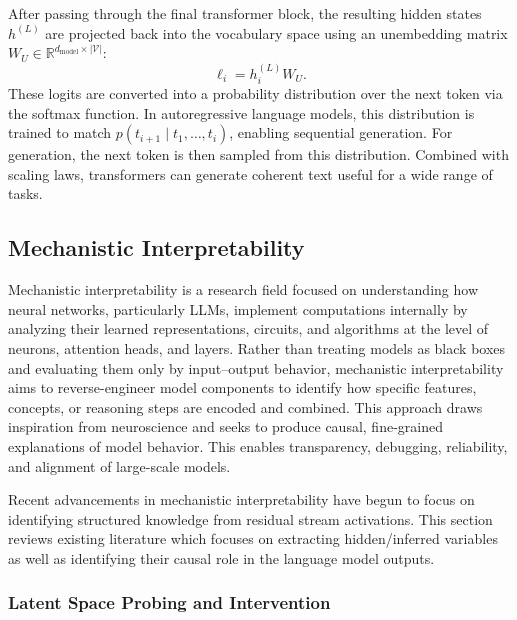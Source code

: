 \documentclass[11pt]{article}
\begin{document}
After passing through the final transformer block, the resulting hidden states $h^{(L)}$ are projected back into the vocabulary space using an unembedding matrix $W_U \in \mathbb{R}^{d_{\text{model}} \times |\mathcal{V}|}$:
\[
\ell_i = h_i^{(L)} W_U.
\]
These logits are converted into a probability distribution over the next token via the softmax function. In autoregressive language models, this distribution is trained to match $p(t_{i+1} \mid t_1, \dots, t_i)$, enabling sequential generation. For generation, the next token is then sampled from this distribution. Combined with scaling laws, transformers can generate coherent text useful for a wide range of tasks. 






\subsection{Mechanistic Interpretability}

Mechanistic interpretability is a research field focused on understanding how neural networks, particularly LLMs, implement computations internally by analyzing their learned representations, circuits, and algorithms at the level of neurons, attention heads, and layers. Rather than treating models as black boxes and evaluating them only by input–output behavior, mechanistic interpretability aims to reverse-engineer model components to identify how specific features, concepts, or reasoning steps are encoded and combined. This approach draws inspiration from neuroscience and seeks to produce causal, fine-grained explanations of model behavior. This enables transparency, debugging, reliability, and alignment of large-scale models. 

Recent advancements in mechanistic interpretability have begun to focus on identifying structured knowledge from residual stream activations. This section reviews existing literature which focuses on extracting hidden/inferred variables as well as identifying their causal role in the language model outputs. 


\subsubsection{Latent Space Probing and Intervention}

\end{document}
